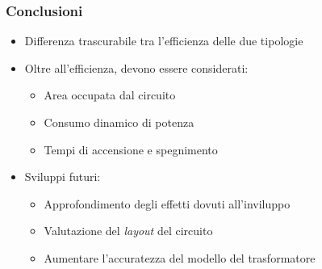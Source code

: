 \documentclass{beamer}
\begin{document}
%
\begin{frame}
\frametitle{Conclusioni}
\begin{itemize}
	\vfill
      \item Differenza trascurabile tra l'efficienza delle due tipologie
      \vfill
      \item Oltre all'efficienza, devono essere considerati:
	\begin{itemize}
            \item Area occupata dal circuito
            \item Consumo dinamico di potenza
      	\item Tempi di accensione e spegnimento
      \end{itemize}
      \vfill
	\item Sviluppi futuri:
	\begin{itemize}
		\item Approfondimento degli effetti dovuti all'inviluppo
		\item Valutazione del \emph{layout} del circuito
		\item Aumentare l'accuratezza del modello del trasformatore
	\end{itemize}
	\vfill
\end{itemize}
\end{frame}
\end{document}
